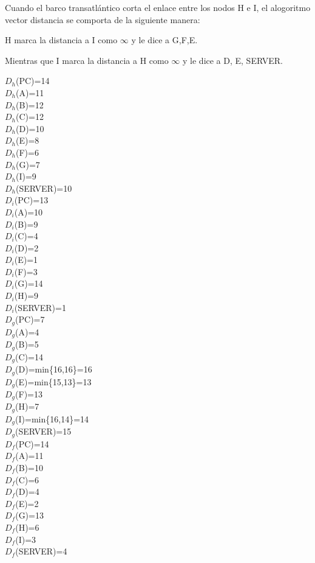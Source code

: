 \documentclass{article}
\begin{document}
{{{Cuando el barco transatl\'antico corta el enlace entre los nodos H e I, el alogoritmo vector distancia se comporta de la siguiente manera:

H marca la distancia a I como $\infty$ y le dice a G,F,E.

Mientras que I marca la distancia a H como $\infty$ y le dice a D, E, SERVER.

$D_h$(PC)=14\\
$D_h$(A)=11\\
$D_h$(B)=12\\
$D_h$(C)=12\\
$D_h$(D)=10\\
$D_h$(E)=8\\
$D_h$(F)=6\\
$D_h$(G)=7\\
$D_h$(I)=9\\
$D_h$(SERVER)=10\\

$D_i$(PC)=13\\
$D_i$(A)=10\\
$D_i$(B)=9\\
$D_i$(C)=4\\
$D_i$(D)=2\\
$D_i$(E)=1\\
$D_i$(F)=3\\
$D_i$(G)=14\\
$D_i$(H)=9\\
$D_i$(SERVER)=1\\

$D_g$(PC)=7\\
$D_g$(A)=4\\
$D_g$(B)=5\\
$D_g$(C)=14\\
$D_g$(D)=min\{16,16\}=16\\
$D_g$(E)=min\{15,13\}=13\\
$D_g$(F)=13\\
$D_g$(H)=7\\
$D_g$(I)=min\{16,14\}=14\\
$D_g$(SERVER)=15\\

$D_f$(PC)=14\\
$D_f$(A)=11\\
$D_f$(B)=10\\
$D_f$(C)=6\\
$D_f$(D)=4\\
$D_f$(E)=2\\
$D_f$(G)=13\\
$D_f$(H)=6\\
$D_f$(I)=3\\
$D_f$(SERVER)=4\\

}}}
\end{document}
